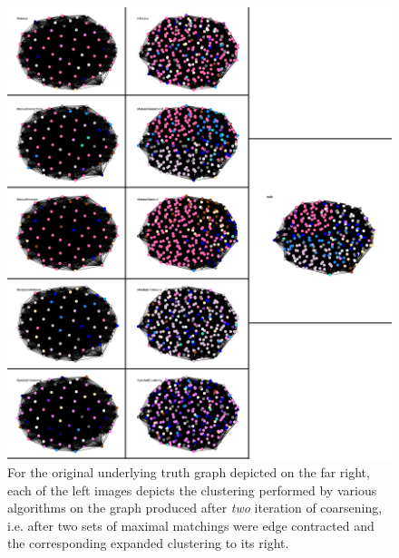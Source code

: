 \documentclass{article}
\begin{document}
\begin{figure}[H]
    \centering
    \includegraphics[width=1.0\textwidth]{results/results_contracted-2.png}
    \caption[Coarsened clustering for two iterations on $p=0.90,q=0.15$]{For the original underlying truth graph depicted on the far right, each of the left images depicts the clustering performed by various algorithms on the graph produced after \textit{two} iteration of coarsening, i.e. after two sets of maximal matchings were edge contracted and the corresponding expanded clustering to its right.}
    \label{fig:results_contracted-2}
\end{figure}
\end{document}
